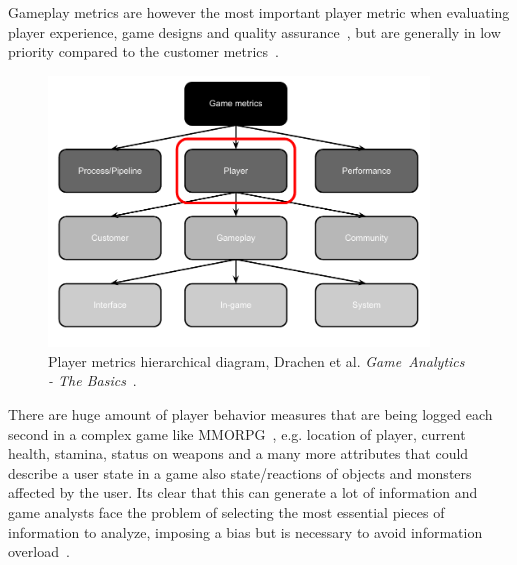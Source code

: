 Gameplay metrics are however the most important player metric when evaluating player experience, game designs and quality assurance~\citep{Kim:2008Tracking, Drachen:2012, Drachen:2011Evaluating}, but are generally in low priority compared to the customer metrics~\citep{Drachen:2013Basics}.
\begin{figure}[here]
\centerline{\includegraphics[width=0.9\textwidth]{Figures/Hierarchical_diagram_gamemetrics.pdf}}
\caption{Player metrics hierarchical diagram, Drachen et al. \textit{Game~Analytics - The Basics}~\citep{Drachen:2013Basics}. }
\label{fig:gamemetrics}
\end{figure}
There are huge amount of player behavior measures that are being logged each second in a complex game like MMORPG~\citep{Kim:2008Tracking, Drachen:2011Evaluating}, e.g. location of player, current health, stamina, status on weapons and a many more attributes that could describe a user state in a game also state/reactions of objects and monsters affected by the user. Its clear that this can generate a lot of information and game analysts face the problem of selecting the most essential pieces of information to analyze, imposing a bias but is necessary to avoid information overload~\citep{Drachen:2013Basics}. 

